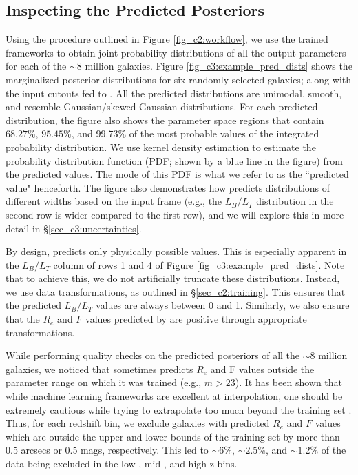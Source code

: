 \subsection{Inspecting the Predicted Posteriors}


Using the procedure outlined in Figure \ref{fig_c2:workflow}, we use the trained \gampen{} frameworks to obtain joint probability distributions of all the output parameters for each of the $\sim 8$ million galaxies. Figure \ref{fig_c3:example_pred_dists} shows the marginalized posterior distributions for six randomly selected galaxies; along with the input cutouts fed to \gampen{}. All the predicted distributions are unimodal, smooth, and resemble Gaussian/skewed-Gaussian distributions. For each predicted distribution, the figure also shows the parameter space regions that contain $68.27\%$, $95.45\%$, and $99.73\%$ of the most probable values of the integrated probability distribution. We use kernel density estimation to estimate the probability distribution function (PDF; shown by a blue line in the figure) from the predicted values. The mode of this PDF is what we refer to as the ``predicted value" henceforth. The figure also demonstrates how \gampen{} predicts distributions of different widths based on the input frame (e.g., the $L_B/L_T$ distribution in the second row is wider compared to the first row), and we will explore this in more detail in \S \ref{sec_c3:uncertainties}. 

By design, \gampen{} predicts only physically possible values. This is especially apparent in the $L_B/L_T$ column of rows 1 and 4 of Figure \ref{fig_c3:example_pred_dists}. Note that to achieve this, we do not artificially truncate these distributions. Instead, we use data transformations, as outlined in \S \ref{sec_c2:training}. This ensures that the predicted $L_B/L_T$ values are always between 0 and 1. Similarly, we also ensure  that the $R_e$ and $F$ values predicted by \gampen{} are positive through appropriate transformations. 

While performing quality checks on the predicted posteriors of all the $\sim 8$ million galaxies, we noticed that sometimes \gampen{} predicts $R_e$ and F values outside the parameter range on which it was trained (e.g., $m > 23$). It has been shown that while machine learning frameworks are excellent at interpolation, one should be extremely cautious while trying to extrapolate too much beyond the training set \citep[e.g.,][]{candela_09, recht_19, taori_20}. Thus, for each redshift bin, we exclude galaxies with predicted $R_e$ and $F$ values which are outside the upper and lower bounds of the training set by more than 0.5 arcsecs or 0.5 mags, respectively. This led to $\sim6\%$, $\sim2.5\%$, and $\sim1.2\%$ of the data being excluded in the low-, mid-, and high-z bins.

